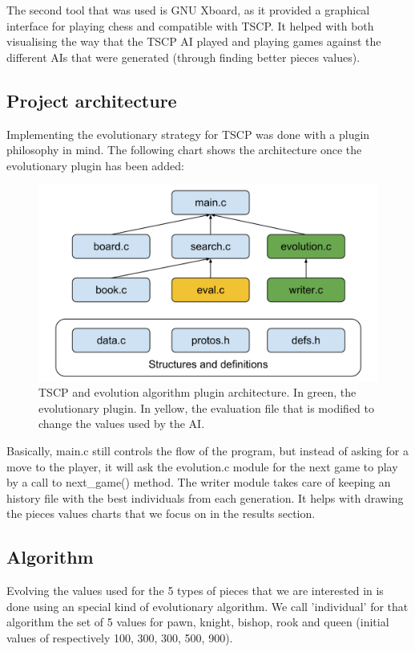 \documentclass[a4paper,12pt,twocolumn]{article}
\begin{document}
The second tool that was used is GNU Xboard, as it provided a graphical interface for playing chess and compatible with TSCP. It helped with both visualising the way that the TSCP AI played and playing games against the different AIs that were generated (through finding better pieces values).

\subsection{Project architecture}
Implementing the evolutionary strategy for TSCP was done with a plugin philosophy in mind. The following chart shows the architecture once the evolutionary plugin has been added:

\begin{center}
\begin{figure}
\includegraphics[scale=0.25]{images/Chess_AI_Architecture.png}
\caption{TSCP and evolution algorithm plugin architecture. In green, the evolutionary plugin. In yellow, the evaluation file that is modified to change the values used by the AI.}
\end{figure}
\end{center}

Basically, main.c still controls the flow of the program, but instead of asking for a move to the player, it will ask the evolution.c module for the next game to play by a call to next\_game() method. The writer module takes care of keeping an history file with the best individuals from each generation. It helps with drawing the pieces values charts that we focus on in the results section.

\subsection{Algorithm}
Evolving the values used for the 5 types of pieces that we are interested in is done using an special kind of evolutionary algorithm. We call 'individual' for that algorithm the set of 5 values for pawn, knight, bishop, rook and queen (initial values of respectively 100, 300, 300, 500, 900).
\end{document}
